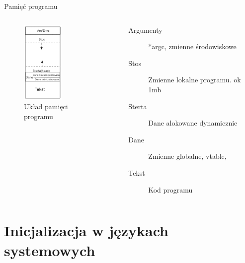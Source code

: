 \documentclass{beamer}
\begin{document}
\begin{frame}[containsverbatim]{Pamięć programu}

\begin{columns}
    \begin{column}{0.5\textwidth} 
        \begin{figure}
        \centering
        \includegraphics[width=2cm]{memory_layout.png}
        \caption{Układ pamięci programu}
        \label{img:memory_layout}
        \end{figure}
    \end{column}
        \begin{column}{0.5\textwidth} 
        \begin{block}{}
            \begin{description}
                \item [Argumenty] *argc, zmienne środowiskowe
                \item [Stos] Zmienne lokalne programu. ok 1mb
                \item [Sterta] Dane alokowane dynamicznie
                \item [Dane] Zmienne globalne, vtable, 
                \item [Tekst] Kod programu
            \end{description}
        \end{block}
    \end{column}
\end{columns}

\end{frame}


\section{Inicjalizacja w językach systemowych}


\end{document}
